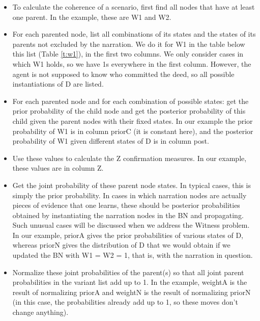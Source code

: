 \documentclass[10pt,]{scrartcl}
\newcommand{\s}[1]{\mbox{\textsf{#1}}}
\begin{document}
\begin{itemize}
    \item To calculate the coherence of a scenario, first  find all nodes that have at least one parent.  In the example, these are \s{W1} and \s{W2}.
    
\item For each parented node,  list all combinations  of its states and the states of its parents not excluded by the narration. We do it for \textsf{W1} in the table below this list (Table \ref{t:w1}), in the first two columns. We only consider cases in which \textsf{W1} holds, so we have 1s everywhere in the first column. However, the agent is not supposed to know who committed the deed, so all possible instantiations of \textsf{D} are listed. 

\item For each parented node and for each combination of possible states: get the prior probability of the child node and get the posterior probability of this child given the parent nodes with their fixed states. In our example the prior probability of \s{W1} is in column \textsf{priorC} (it is constant here), and the posterior probability of \textsf{W1} given different states of \textsf{D} is in column \s{post}. 



\item Use these values to calculate the \s{Z} confirmation measures. In our example, these values are in column \s{Z}. 
    
\item Get the joint probability of these parent node states. In typical cases, this is simply the prior probability. In cases in which narration nodes are actually pieces of evidence that one learns, these should be posterior probabilities obtained by instantiating the narration nodes in the BN and propagating. Such  unusual cases will be discussed when we address the \textsf{Witness} problem.   In our example, \textsf{priorA} gives the prior probabilities of various states of \textsf{D}, whereas \textsf{priorN} gives the distribution of \textsf{D} that we would obtain if we updated the BN with \textsf{W1} = \textsf{W2} = 1, that is, with the narration in question. 


\item Normalize these joint probabilities of the parent(s) so that all joint parent probabilities in the variant list add up to 1.  In the example, \textsf{weightA} is the result of normalizing \textsf{priorA} and \textsf{weightN} is the result of normalizing \textsf{priorN} (in this case, the probabilities already add up to 1, so these moves don't change anything).



\end{itemize}
\end{document}
